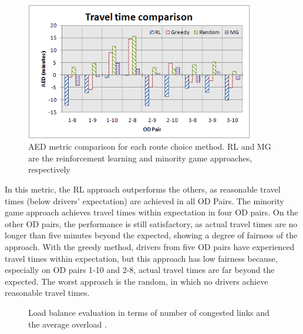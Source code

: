 \documentclass{RITA}
\begin{document}
\begin{figure}[ht]
    \centerline{\includegraphics[width=10cm]{img/travelTimeComparison-hatched.png}}
    \caption{AED metric comparison for each route choice method. RL and MG are the reinforcement learning and minority game approaches, respectively}
    \label{fig:travelTimeComparison}
\end{figure}

In this metric, the RL approach outperforms the others, as reasonable travel times (below drivers' expectation) are achieved in all OD Pairs. The minority game approach achieves travel times within expectation in four OD pairs. On the other OD pairs, the performance is still satisfactory, as actual travel times are no longer than five minutes beyond the expected, showing a degree of fairness of the approach. With the greedy method, drivers from five OD pairs have experienced travel times within expectation, but this approach has low fairness because, especially on OD pairs 1-10 and 2-8, actual travel times are far beyond the expected. The worst approach is the random, in which no drivers achieve reasonable travel times.


\begin{figure}[ht]
  \centering
  \caption{Load balance evaluation in terms of number of congested links  and the average overload .}
  \label{fig:loadBalance}
\end{figure}
\end{document}
